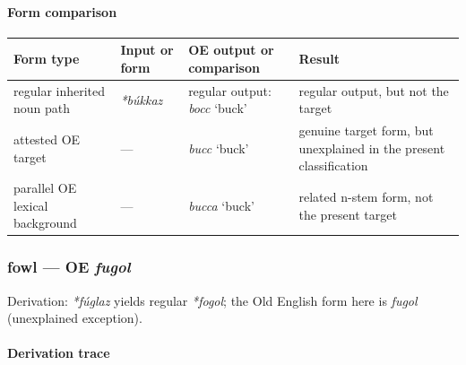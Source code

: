\documentclass[
  british,
  a4paper,
]{article}
\newcounter{none} %
\providecommand{\Recon}[1]{\emph{*#1}}
\begin{document}
\paragraph{Form comparison}\label{form-comparison-6}

{\def\LTcaptype{none} %
\begin{longtable}[]{@{}
  >{\raggedright\arraybackslash}p{}
  >{\raggedright\arraybackslash}p{}
  >{\raggedright\arraybackslash}p{}
  >{\raggedright\arraybackslash}p{}@{}}
\toprule\noalign{}
\begin{minipage}[b]{\linewidth}\raggedright
Form type
\end{minipage} & \begin{minipage}[b]{\linewidth}\raggedright
Input or form
\end{minipage} & \begin{minipage}[b]{\linewidth}\raggedright
OE output or comparison
\end{minipage} & \begin{minipage}[b]{\linewidth}\raggedright
Result
\end{minipage} \\
\midrule\noalign{}
\endhead
\bottomrule\noalign{}
\endlastfoot
regular inherited noun path & {\emph{*búkkaz}} & regular output:
{\emph{bocc}} `buck' & regular output, but not the target \\
attested OE target & --- & {\emph{bucc}} `buck' & genuine target form,
but unexplained in the present classification \\
parallel OE lexical background & --- & {\emph{bucca}} `buck' & related
n-stem form, not the present target \\
\end{longtable}
}

\subsubsection{\texorpdfstring{fowl --- OE
\emph{fugol}}{fowl --- OE fugol}}\label{fowl-oe-fugol}

Derivation: \emph{*fúglaz} yields regular \Recon{fogol}; the Old English
form here is \emph{fugol} (unexplained exception).

\paragraph{Derivation trace}\label{derivation-trace-183}
\end{document}
